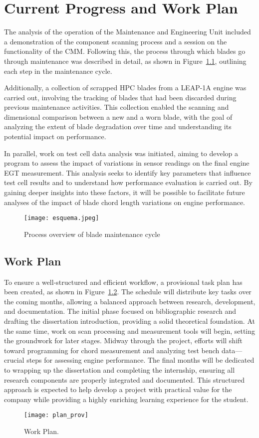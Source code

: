 \chapter{Current Progress and Work Plan}
\label{cha:planeamento}

The analysis of the operation of the Maintenance and Engineering Unit included a demonstration of the component scanning process and a session on the functionality of the \gls{CMM}. Following this, the process through which blades go through maintenance was described in detail, as shown in Figure~\ref{fig:esquema}, outlining each step in the maintenance cycle.

Additionally, a collection of scrapped \gls{HPC} blades from a \gls{LEAP}-1A engine was carried out, involving the tracking of blades that had been discarded during previous maintenance activities. This collection enabled the scanning and dimensional comparison between a new and a worn blade, with the goal of analyzing the extent of blade degradation over time and understanding its potential impact on performance.

In parallel, work on test cell data analysis was initiated, aiming to develop a program to assess the impact of variations in sensor readings on the final engine \gls{EGT} measurement. This analysis seeks to identify key parameters that influence test cell results and to understand how performance evaluation is carried out. By gaining deeper insights into these factors, it will be possible to facilitate future analyses of the impact of blade chord length variations on engine performance.

\begin{figure}[H]
    \centering
    \texttt{[image: esquema.jpeg]}
    \caption{Process overview of blade maintenance cycle}
    \label{fig:esquema}
\end{figure}

\section{Work Plan}
\label{sec:plano}

To ensure a well-structured and efficient workflow, a provisional task plan has been created, as shown in Figure~\ref{fig:plan_prov}. The schedule will distribute key tasks over the coming months, allowing a balanced approach between research, development, and documentation. The initial phase focused on bibliographic research and drafting the dissertation introduction, providing a solid theoretical foundation. At the same time, work on scan processing and measurement tools will begin, setting the groundwork for later stages. Midway through the project, efforts will shift toward programming for chord measurement and analyzing test bench data—crucial steps for assessing engine performance. The final months will be dedicated to wrapping up the dissertation and completing the internship, ensuring all research components are properly integrated and documented. This structured approach is expected to help develop a project with practical value for the company while providing a highly enriching learning experience for the student.

\begin{figure}[H]
    \centering
    \texttt{[image: plan\_prov]}
    \caption{Work Plan.}
    \label{fig:plan_prov}
\end{figure}


